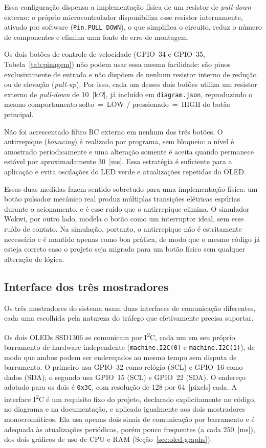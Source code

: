 \documentclass[12pt,a4paper]{article}
\begin{document}
Essa configuração dispensa a implementação física de um resistor de \textit{pull-down} externo: o próprio microcontrolador disponibiliza esse resistor internamente, ativado por software (\texttt{Pin.PULL\_DOWN}), o que simplifica o circuito, reduz o número de componentes e elimina uma fonte de erro de montagem.

Os dois botões de controle de velocidade (GPIO~34 e GPIO~35, Tabela~\ref{tab:pinagem}) não podem usar essa mesma facilidade: são pinos exclusivamente de entrada e não dispõem de nenhum resistor interno de redução ou de elevação (\textit{pull-up}). Por isso, cada um desses dois botões utiliza um resistor externo de \textit{pull-down} de 10~[k$\Omega$], já incluído em \texttt{diagram.json}, reproduzindo o mesmo comportamento solto~=~LOW / pressionado~=~HIGH do botão principal.

Não foi acrescentado filtro RC externo em nenhum dos três botões. O antirrepique (\textit{bouncing}) é realizado por programa, sem bloqueio: o nível é amostrado periodicamente e uma alteração somente é aceita quando permanece estável por aproximadamente 30~[ms]. Essa estratégia é suficiente para a aplicação e evita oscilações do LED verde e atualizações repetidas do OLED.

Essas duas medidas fazem sentido sobretudo para uma implementação física: um botão pulsador mecânico real produz múltiplas transições elétricas espúrias durante o acionamento, e é esse ruído que o antirrepique elimina. O simulador Wokwi, por outro lado, modela o botão como um interruptor ideal, sem esse ruído de contato. Na simulação, portanto, o antirrepique não é estritamente necessário e é mantido apenas como boa prática, de modo que o mesmo código já esteja correto caso o projeto seja migrado para um botão físico sem qualquer alteração de lógica.

\subsection{Interface dos três mostradores}
\label{sec:mostrador-interface}

Os três mostradores do sistema usam duas interfaces de comunicação diferentes, cada uma escolhida pela natureza do tráfego que efetivamente precisa suportar.

Os dois OLEDs SSD1306 se comunicam por I\textsuperscript{2}C, cada um em seu próprio barramento de hardware independente (\texttt{machine.I2C(0)} e \texttt{machine.I2C(1)}), de modo que ambos podem ser endereçados ao mesmo tempo sem disputa de barramento. O primeiro usa GPIO~32 como relógio (SCL) e GPIO~16 como dados (SDA); o segundo usa GPIO~15 (SCL) e GPIO~22 (SDA). O endereço adotado para os dois é \texttt{0x3C}, com resolução de 128 por 64~[pixels] cada. A interface I\textsuperscript{2}C é um requisito fixo do projeto, declarado explicitamente no código, no diagrama e na documentação, e aplicado igualmente aos dois mostradores monocromáticos. Ela usa apenas dois sinais de comunicação por barramento e é adequada às atualizações periódicas, porém pouco frequentes (a cada 250~[ms]), dos dois gráficos de uso de CPU e RAM (Seção~\ref{sec:oled-graphs}).
\end{document}
